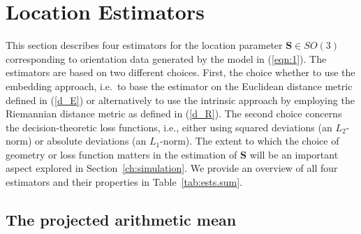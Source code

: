 \section{Location Estimators}\label{sec:estimators}
This section describes four estimators for the location parameter $\bm{S}\in SO(3)$ corresponding to orientation data generated by the model in (\ref{eqn:1}). The estimators are based on two different choices. First, the choice whether to use the embedding approach, i.e.~to base the estimator on the Euclidean distance metric  defined in (\ref{d_E})  or alternatively to use the intrinsic approach by employing the Riemannian distance metric as defined in (\ref{d_R}). The second choice concerns the decision-theoretic loss functions, i.e., either using squared deviations  (an $L_2$-norm) or  absolute deviations (an $L_1$-norm).  The extent to which the choice of geometry or loss function matters in the estimation of $\bm{S}$ will be an important aspect explored in Section~\ref{ch:simulation}.  We provide an overview of all four estimators and their properties in Table~\ref{tab:ests.sum}.




\subsection{The projected arithmetic mean}
\label{subsec:pam}

